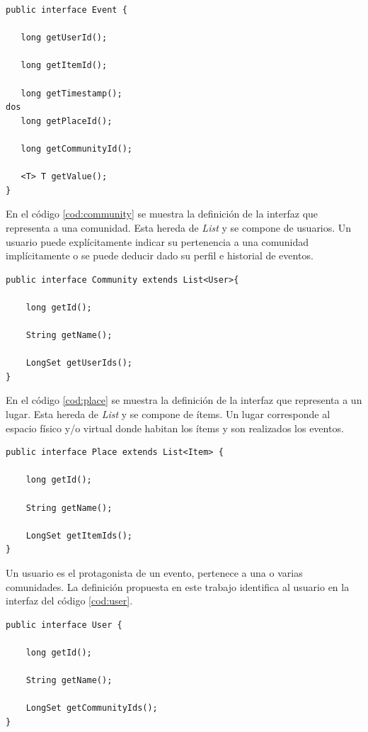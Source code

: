 \begin{lstlisting}[float, caption = Interfaz Event, label = cod:event]
public interface Event {

   long getUserId();

   long getItemId();

   long getTimestamp();
dos
   long getPlaceId();

   long getCommunityId();  

   <T> T getValue();
}
\end{lstlisting}

 En el código \ref{cod:community} se muestra la definición de la interfaz que representa a una comunidad. Esta hereda de \textit{List} y se compone de usuarios. Un usuario puede explícitamente indicar su pertenencia a una comunidad implícitamente o se puede deducir dado su perfil e historial de eventos. 

\begin{lstlisting}[float, caption = Interfaz Community, label = cod:community]
public interface Community extends List<User>{  

    long getId();

    String getName();
   
    LongSet getUserIds();
}
\end{lstlisting}

En el código \ref{cod:place} se muestra la definición de la interfaz que representa a un lugar. Esta hereda de \textit{List} y se compone de ítems. Un lugar corresponde al espacio físico y/o virtual donde habitan los ítems y son realizados los eventos. 

\begin{lstlisting}[float,caption = Interfaz Place, label = cod:place]
public interface Place extends List<Item> {   

    long getId();
  
    String getName();

    LongSet getItemIds();  
}
\end{lstlisting}

Un usuario es el protagonista de un evento, pertenece a una o varias comunidades. La definición propuesta en este trabajo identifica al usuario en la interfaz del código \ref{cod:user}.

\begin{lstlisting}[float,caption = Interfaz User, label = cod:user]
public interface User {

    long getId();

    String getName();

    LongSet getCommunityIds();
}
\end{lstlisting}


